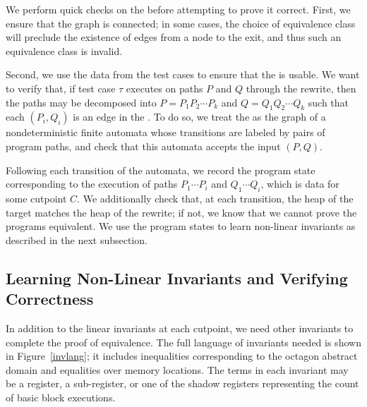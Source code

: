 We perform quick checks on the \bisimrep{} before attempting to prove
it correct. First, we ensure that the graph is connected; in some
cases, the choice of equivalence class will preclude the existence of
edges from a node to the exit, and thus such an equivalence class is
invalid.

Second, we use the data from the test cases to ensure that the
\bisimrep{} is usable. We want to verify that, if test case $\tau$
executes on paths $P$ and $Q$ through the rewrite, then the paths
may be decomposed into $P = P_1P_2\dotsm P_k$ and $Q = Q_1Q_2\dotsm
Q_k$ such that each $(P_i, Q_i)$ is an edge in the \bisimrep. To do
so, we treat the \bisimrep{} as the graph of a nondeterministic finite
automata whose transitions are labeled by pairs of program paths, and
check that this automata accepts the input $(P, Q)$. 

Following each transition of the automata, we record the program state
corresponding to the execution of paths $P_1\dotsm P_i$ and $Q_1
\dotsm Q_i$, which is data for some cutpoint $C$. We additionally
check that, at each transition, the heap of the target matches the
heap of the rewrite; if not, we know that we cannot prove the programs
equivalent. We use the program states to learn non-linear invariants
as described in the next subsection.

\subsection{Learning Non-Linear Invariants and Verifying Correctness} \label{algstep6}

In addition to the linear invariants at each cutpoint, we need other
invariants to complete the proof of equivalence. The full language
of invariants needed is shown in Figure~\ref{invlang}; it includes
inequalities corresponding to the octagon abstract domain
and equalities over memory locations. The terms in each invariant
may be a register, a sub-register, or one of the shadow registers
representing the count of basic block executions.  

